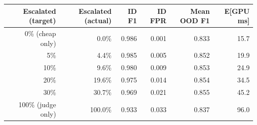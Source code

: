 \begin{tabular}{rrrrrr}
\toprule
Escalated (target) & Escalated (actual) & ID F1 & ID FPR & Mean OOD F1 & E[GPU ms] \\
\midrule
0\% (cheap only) & 0.0\% & 0.986 & 0.001 & 0.833 & 15.7 \\
5\% & 4.4\% & 0.985 & 0.005 & 0.852 & 19.9 \\
10\% & 9.6\% & 0.980 & 0.009 & 0.853 & 24.9 \\
20\% & 19.6\% & 0.975 & 0.014 & 0.854 & 34.5 \\
30\% & 30.7\% & 0.969 & 0.021 & 0.855 & 45.2 \\
100\% (judge only) & 100.0\% & 0.933 & 0.033 & 0.837 & 96.0 \\
\bottomrule
\end{tabular}